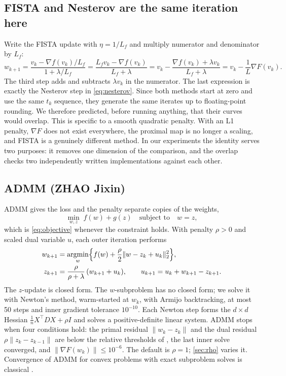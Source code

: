\documentclass{article}
\newcommand{\argmin}{\operatorname*{argmin}}
\begin{document}
\subsection{FISTA and Nesterov are the same iteration here}
\label{sec:equivalence}
Write the FISTA update with $\eta=1/L_f$ and multiply numerator and denominator by $L_f$:
\begin{equation}
\label{eq:equivalence}
w_{k+1}=\frac{v_k-\nabla f(v_k)/L_f}{1+\lambda/L_f}
=\frac{L_f v_k-\nabla f(v_k)}{L_f+\lambda}
=v_k-\frac{\nabla f(v_k)+\lambda v_k}{L_f+\lambda}
=v_k-\frac{1}{L}\nabla F(v_k).
\end{equation}
The third step adds and subtracts $\lambda v_k$ in the numerator. The last expression is exactly the Nesterov step in \eqref{eq:nesterov}. Since both methods start at zero and use the same $t_k$ sequence, they generate the same iterates up to floating-point rounding. We therefore predicted, before running anything, that their curves would overlap. This is specific to a smooth quadratic penalty. With an L1 penalty, $\nabla F$ does not exist everywhere, the proximal map is no longer a scaling, and FISTA is a genuinely different method. In our experiments the identity serves two purposes: it removes one dimension of the comparison, and the overlap checks two independently written implementations against each other.

\subsection{ADMM (ZHAO Jixin)}
ADMM gives the loss and the penalty separate copies of the weights,
\begin{equation}
\min_{w,z}\; f(w)+g(z)\quad\text{subject to}\quad w=z,
\end{equation}
which is \eqref{eq:objective} whenever the constraint holds. With penalty $\rho>0$ and scaled dual variable $u$, each outer iteration performs
\begin{align}
w_{k+1}&=\argmin_w\Bigl\{f(w)+\frac\rho2\|w-z_k+u_k\|_2^2\Bigr\},\label{eq:admm-w}\\
z_{k+1}&=\frac{\rho}{\rho+\lambda}\,(w_{k+1}+u_k),\qquad
u_{k+1}=u_k+w_{k+1}-z_{k+1}.
\end{align}
The $z$-update is closed form. The $w$-subproblem has no closed form; we solve it with Newton's method, warm-started at $w_k$, with Armijo backtracking, at most 50 steps and inner gradient tolerance $10^{-10}$. Each Newton step forms the $d\times d$ Hessian $\frac1nX^\top DX+\rho I$ and solves a positive-definite linear system. ADMM stops when four conditions hold: the primal residual $\|w_k-z_k\|$ and the dual residual $\rho\|z_k-z_{k-1}\|$ are below the relative thresholds of \citet{boyd2011admm}, the last inner solve converged, and $\|\nabla F(w_k)\|\le10^{-6}$. The default is $\rho=1$; \cref{sec:rho} varies it. Convergence of ADMM for convex problems with exact subproblem solves is classical \citep{boyd2011admm,he2012convergence}.
\end{document}
